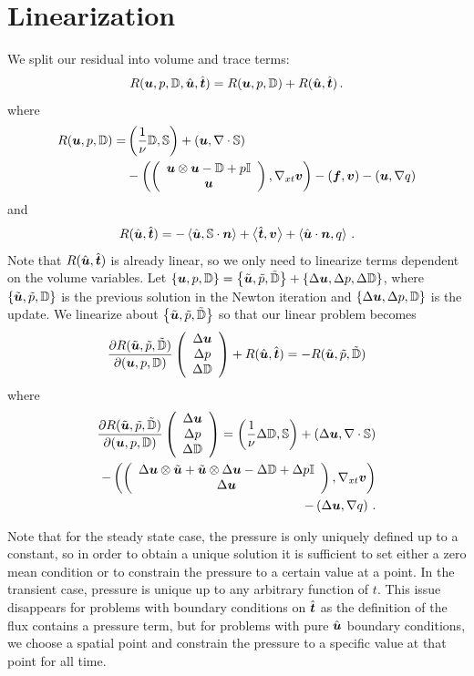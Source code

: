 \documentclass[Dissertation.tex]{subbIles}
\begin{document}
\section{Linearization}
We split our residual into volume and trace terms:
\[
R(\boldsymbol u,p,\mathbb{D},\hat{\boldsymbol u},\hat{\boldsymbol t})=R(\boldsymbol u,p,\mathbb{D})+R(\hat{\boldsymbol u},\hat{\boldsymbol t})\,.
\]
where
\begin{align*}
R(\boldsymbol u,p,\mathbb{D})=&
  \left( \frac{1}{\nu}\mathbb{D},\mathbb{S} \right)
  +\left( \boldsymbol u,\nabla\cdot\mathbb{S} \right)
  \\&
  -\left( \left( \begin{array}{c} \boldsymbol u\otimes\boldsymbol u-\mathbb{D}+p\mathbb{I}\\ \boldsymbol u\\ \end{array} \right),\nabla_{xt}\boldsymbol v \right)
  -(\boldsymbol f,\boldsymbol v)
  -\left( \boldsymbol u,\nabla q \right)
\end{align*}
and
\begin{align*}
R(\hat{\boldsymbol u},\hat{\boldsymbol t})=
  -\left\langle \hat{\boldsymbol u},\mathbb{S}\cdot\boldsymbol n \right\rangle
  +\left\langle \hat{\boldsymbol t},\boldsymbol v \right\rangle
  +\left\langle \hat{\boldsymbol u}\cdot\boldsymbol n,q \right\rangle\,.
\end{align*}
Note that $R(\hat{\boldsymbol u},\hat{\boldsymbol t})$ is already linear, so we only need to linearize terms dependent on 
the volume variables. Let 
$\left\{ \boldsymbol u,p,\mathbb{D} \right\}=\left\{ \tilde{\boldsymbol u},\tilde p,\tilde{\mathbb{D}} \right\}+\left\{ \Delta\boldsymbol u,\Delta p,\Delta\mathbb{D} \right\}$,
where $\left\{ \tilde{\boldsymbol u},\tilde p,\mathbb{D} \right\}$ is the previous solution in the Newton iteration 
and $\left\{ \Delta\boldsymbol u,\Delta p,\mathbb{D} \right\}$ is the update.
We linearize about $\left\{ \tilde{\boldsymbol u},\tilde p,\tilde{\mathbb{D}} \right\}$ so that our linear problem becomes
\[
\frac{\partial R(\tilde{\boldsymbol u},\tilde p,\tilde{\mathbb{D}})}{\partial(\boldsymbol u,p,\mathbb{D})}\left( \begin{array}{c} \Delta\boldsymbol u\\ \Delta p\\ \Delta\mathbb{D}\\ \end{array} \right)+R(\hat{\boldsymbol u},\hat{\boldsymbol t})
=-R(\tilde{\boldsymbol u},\tilde p,\tilde{\mathbb{D}})
\]
where 
\begin{align*}
\frac{\partial R(\tilde{\boldsymbol u},\tilde p,\tilde{\mathbb{D}})}{\partial(\boldsymbol u,p,\mathbb{D})}\left( \begin{array}{c} \Delta\boldsymbol u\\ \Delta p\\ \Delta\mathbb{D}\\ \end{array} \right)=
  \left( \frac{1}{\nu}\Delta\mathbb{D},\mathbb{S} \right)
  +\left( \Delta\boldsymbol u,\nabla\cdot\mathbb{S} \right)
  \\
  -\left( \left( \begin{array}{c} \Delta\boldsymbol u\otimes\tilde{\boldsymbol u}+\tilde{\boldsymbol u}\otimes\Delta\boldsymbol u-\Delta\mathbb{D}+\Delta p\mathbb{I}\\ \Delta\boldsymbol u\\ \end{array} \right),\nabla_{xt}\boldsymbol v \right)
  \\
  -\left( \Delta\boldsymbol u,\nabla q \right)\,.
\end{align*}

Note that for the steady state case, the pressure is only uniquely defined up to a constant,
so in order to obtain a unique solution it is sufficient to set either a zero mean condition
or to constrain the pressure to a certain value at a point.
In the transient case, pressure is unique up to any arbitrary function of $t$.
This issue disappears for problems with boundary conditions on $\hat{\boldsymbol t}$ as the definition 
of the flux contains a pressure term, but for problems with pure $\hat{\boldsymbol u}$ boundary conditions,
we choose a spatial point and constrain the pressure to a specific value at that point for all time.
\end{document}
